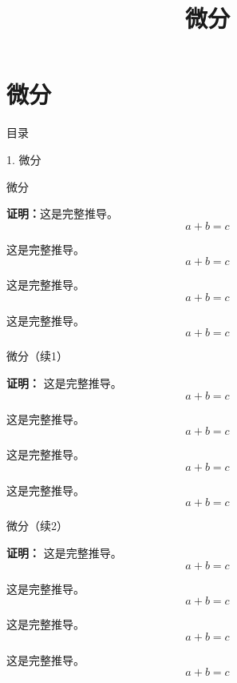 \documentclass[aspectratio=169,10pt,fontset=fandol]{ctexbeamer}
\title{微分}
\newenvironment{proofdetail}{\par\noindent\textbf{证明：}\quad}{\par}
\begin{document}
\section{微分}
\begin{frame}[t,fragile]{目录}
\normalsize
{\color{blue}\normalsize 1. 微分\par}\vspace{0.22em}
\end{frame}
\begin{frame}[t,fragile]{微分}
\footnotesize
{\footnotesize
\begin{extra}\begin{proofdetail}这是完整推导。\[a+b=c\]

这是完整推导。\[a+b=c\]

这是完整推导。\[a+b=c\]

这是完整推导。\[a+b=c\]


\end{proofdetail}\end{extra}
}
\end{frame}
\begin{frame}[t,fragile]{微分（续1）}
\footnotesize
{\footnotesize
\begin{extra}\begin{proofdetail}
这是完整推导。\[a+b=c\]

这是完整推导。\[a+b=c\]

这是完整推导。\[a+b=c\]

这是完整推导。\[a+b=c\]


\end{proofdetail}\end{extra}
}
\end{frame}
\begin{frame}[t,fragile]{微分（续2）}
\footnotesize
{\footnotesize
\begin{extra}\begin{proofdetail}
这是完整推导。\[a+b=c\]

这是完整推导。\[a+b=c\]

这是完整推导。\[a+b=c\]

这是完整推导。\[a+b=c\]


\end{proofdetail}\end{extra}
}
\end{frame}
\end{document}
